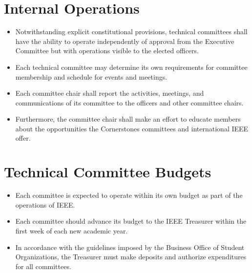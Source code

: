 \documentclass[12pt]{constitution}
\begin{document}
\section{Internal Operations}
\label{sec:tech_operate}
\begin{itemize}
    \item Notwithstanding explicit constitutional provisions, technical committees shall have the ability to operate independently of approval from the Executive Committee but with operations visible to the elected officers.
    \item Each technical committee may determine its own requirements for committee membership and schedule for events and meetings.
    \item Each committee chair shall report the activities, meetings, and communications of its committee to the officers and other committee chairs.
    \item Furthermore, the committee chair shall make an effort to educate members about the opportunities the Cornerstones committees and international IEEE offer.
\end{itemize}

\section{Technical Committee Budgets}
\label{sec:tech_budget}
\begin{itemize}
    \item Each committee is expected to operate within its own budget as part of the operations of IEEE.
    \item Each committee should advance its budget to the IEEE Treasurer within the first week of each new academic year.
    \item In accordance with the guidelines imposed by the Business Office of Student Organizations, the Treasurer must make deposits and authorize expenditures for all committees.
\end{itemize}
\end{document}
